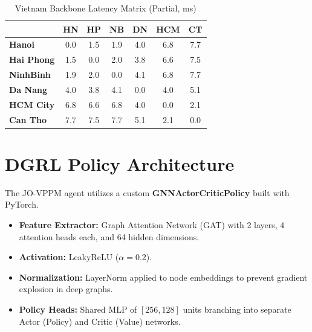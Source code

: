 \begin{table}[H]
\centering
\caption{Vietnam Backbone Latency Matrix (Partial, ms)}
\label{table:appendix_latency}
\small
\begin{tabular}{l|cccccc}
\toprule
 & \textbf{HN} & \textbf{HP} & \textbf{NB} & \textbf{DN} & \textbf{HCM} & \textbf{CT} \\
\midrule
\textbf{Hanoi}     & 0.0 & 1.5 & 1.9 & 4.0 & 6.8 & 7.7 \\
\textbf{Hai Phong} & 1.5 & 0.0 & 2.0 & 3.8 & 6.6 & 7.5 \\
\textbf{NinhBinh}  & 1.9 & 2.0 & 0.0 & 4.1 & 6.8 & 7.7 \\
\textbf{Da Nang}   & 4.0 & 3.8 & 4.1 & 0.0 & 4.0 & 5.1 \\
\textbf{HCM City}  & 6.8 & 6.6 & 6.8 & 4.0 & 0.0 & 2.1 \\
\textbf{Can Tho}   & 7.7 & 7.5 & 7.7 & 5.1 & 2.1 & 0.0 \\
\bottomrule
\end{tabular}
\end{table}

\chapter{DGRL Policy Architecture}
\label{appendix:neural_arch}
The JO-VPPM agent utilizes a custom \textbf{GNNActorCriticPolicy} built with PyTorch.
\begin{itemize}
    \item \textbf{Feature Extractor:} Graph Attention Network (GAT) with 2 layers, 4 attention heads each, and 64 hidden dimensions.
    \item \textbf{Activation:} LeakyReLU ($\alpha=0.2$).
    \item \textbf{Normalization:} LayerNorm applied to node embeddings to prevent gradient explosion in deep graphs.
    \item \textbf{Policy Heads:} Shared MLP of $[256, 128]$ units branching into separate Actor (Policy) and Critic (Value) networks.
\end{itemize}

\newpage
{} 
\printbibliography


